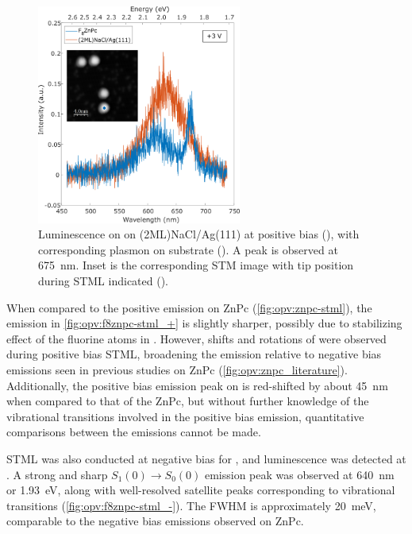 \begin{figure} [H]
    \centering
        \includegraphics[width=0.6\textwidth]{pictures/f8znpc_+ve_emission_inset.png}
    \caption{Luminescence on  on (2ML)NaCl/Ag(111) at positive bias (), with corresponding plasmon on substrate (). A peak is observed at \SI{675}{nm}. Inset is the corresponding STM image with tip position during STML indicated (). }
    \label{fig:opv:f8znpc-stml_+}
\end{figure}

When compared to the positive emission on ZnPc (\autoref{fig:opv:znpc-stml}), the emission in \autoref{fig:opv:f8znpc-stml_+} is slightly sharper, possibly due to stabilizing effect of the fluorine atoms in . However, shifts and rotations of  were observed during positive bias \ac{STML}, broadening the emission relative to negative bias emissions seen in previous studies on ZnPc (\autoref{fig:opv:znpc_literature}). Additionally, the positive bias emission peak on  is red-shifted by about \SI{45}{nm} when compared to that of the ZnPc, but without further knowledge of the vibrational transitions involved in the positive bias emission, quantitative comparisons between the emissions cannot be made.

\ac{STML} was also conducted at negative bias for , and luminescence was detected at . A strong and sharp $S_1(0) \rightarrow S_0(0)$ emission peak was observed at \SI{640}{nm} or \SI{1.93}{eV}, along with well-resolved satellite peaks corresponding to vibrational transitions (\autoref{fig:opv:f8znpc-stml_-}). The \ac{FWHM} is approximately \SI{20}{meV}, comparable to the negative bias emissions observed on ZnPc. 


